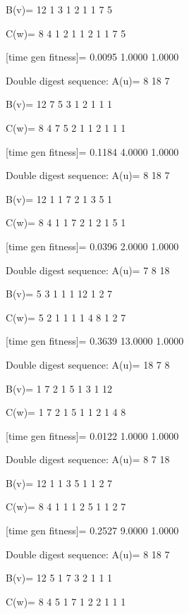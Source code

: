 B(v)=
    12     1     3     1     2     1     1     7     5

C(w)=
     8     4     1     2     1     1     2     1     1     7     5

[time gen fitness]=
    0.0095    1.0000    1.0000

Double digest sequence:
A(u)=
     8    18     7

B(v)=
    12     7     5     3     1     2     1     1     1

C(w)=
     8     4     7     5     2     1     1     2     1     1     1

[time gen fitness]=
    0.1184    4.0000    1.0000

Double digest sequence:
A(u)=
     8    18     7

B(v)=
    12     1     1     7     2     1     3     5     1

C(w)=
     8     4     1     1     7     2     1     2     1     5     1

[time gen fitness]=
    0.0396    2.0000    1.0000

Double digest sequence:
A(u)=
     7     8    18

B(v)=
     5     3     1     1     1    12     1     2     7

C(w)=
     5     2     1     1     1     1     4     8     1     2     7

[time gen fitness]=
    0.3639   13.0000    1.0000

Double digest sequence:
A(u)=
    18     7     8

B(v)=
     1     7     2     1     5     1     3     1    12

C(w)=
     1     7     2     1     5     1     1     2     1     4     8

[time gen fitness]=
    0.0122    1.0000    1.0000

Double digest sequence:
A(u)=
     8     7    18

B(v)=
    12     1     1     3     5     1     1     2     7

C(w)=
     8     4     1     1     1     2     5     1     1     2     7

[time gen fitness]=
    0.2527    9.0000    1.0000

Double digest sequence:
A(u)=
     8    18     7

B(v)=
    12     5     1     7     3     2     1     1     1

C(w)=
     8     4     5     1     7     1     2     2     1     1     1

